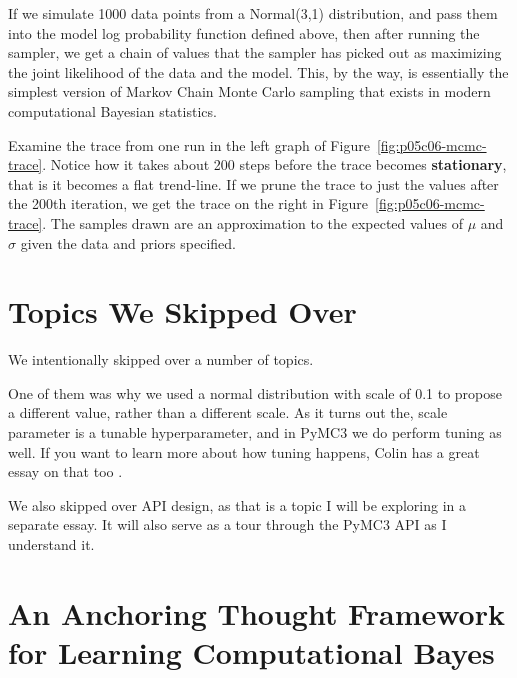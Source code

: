 If we simulate 1000 data points from a Normal(3,1) distribution, and pass them into the model log probability function defined above, then after running the sampler, we get a chain of values that the sampler has picked out as maximizing the joint likelihood of the data and the model. This, by the way, is essentially the simplest version of Markov Chain Monte Carlo sampling that exists in modern computational Bayesian statistics.

Examine the trace from one run in the left graph of Figure~\ref{fig:p05c06-mcmc-trace}. Notice how it takes about 200 steps before the trace becomes \textbf{stationary}, that is it becomes a flat trend-line. If we prune the trace to just the values after the 200th iteration, we get the trace on the right in Figure~\ref{fig:p05c06-mcmc-trace}.
The samples drawn are an approximation to the expected values of $\mu$
and $\sigma$ given the data and priors specified.

\section{Topics We Skipped Over}

We intentionally skipped over a number of topics.

One of them was why we used a normal distribution with scale of 0.1 to propose a different value, rather than a different scale. As it turns out the, scale parameter is a tunable hyperparameter, and in PyMC3 we do perform tuning as well. If you want to learn more about how tuning happens, Colin has a great essay on that too \cite{ColinCarrollParameterAdaptationPyMC32019}.

We also skipped over API design, as that is a topic I will be exploring in a separate essay. It will also serve as a tour through the PyMC3 API as I understand it.

\section{An Anchoring Thought Framework for Learning Computational Bayes}

